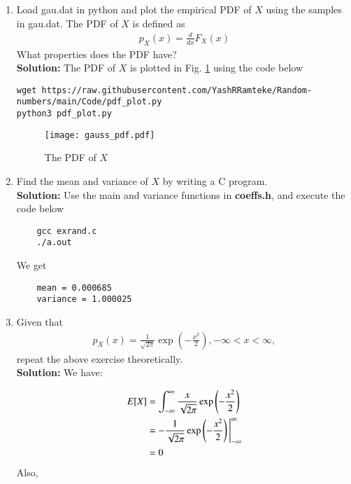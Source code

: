 \documentclass[journal,12pt,twocolumn]{IEEEtran}
\newcommand{\solution}{\noindent \textbf{Solution: }}
\providecommand{\brak}[1]{\ensuremath{\left(#1\right)}}
\numberwithin{equation}{section}
\renewcommand\thesection{\arabic{section}}
\begin{document}
\begin{enumerate}[label=\thesection.\arabic*
,ref=\thesection.\theenumi]
\item
Load gau.dat in python and plot the empirical PDF of $X$ using the samples in gau.dat. The PDF of $X$ is defined as
\begin{align}
p_{X}(x) = \frac{d}{dx}F_{X}(x)
\end{align}
What properties does the PDF have?
\\
\solution The PDF of $X$ is plotted in Fig. \ref{fig:gauss_pdf} using the code below
\begin{lstlisting}
wget https://raw.githubusercontent.com/YashRRamteke/Random-numbers/main/Code/pdf_plot.py
python3 pdf_plot.py
\end{lstlisting}
\begin{figure}
\centering
\texttt{[image: gauss\_pdf.pdf]}
\caption{The PDF of $X$}
\label{fig:gauss_pdf}
\end{figure}

\item Find the mean and variance of $X$ by writing a C program.
\\
\solution Use the main and variance functions in \textbf{coeffs.h}, and execute the code below
\begin{lstlisting}
    gcc exrand.c
    ./a.out
\end{lstlisting}
We get
\begin{lstlisting}
    mean = 0.000685
    variance = 1.000025
\end{lstlisting}


\item Given that 
\begin{align}
p_{X}(x) = \frac{1}{\sqrt{2\pi}}\exp\brak{-\frac{x^2}{2}}, -\infty < x < \infty,
\end{align}
repeat the above exercise theoretically.
\\
\solution  We have:
    
\begin{align}
    E[X] &=  \int_{-\infty}^{\infty} \frac{x}{\sqrt{2\pi}}\exp{\left(-\frac{x^2}{2}\right)} \\
    &= -\frac{1}{\sqrt{2\pi}}\exp\brak{-\frac{x^2}{2}} \Bigg{|}_{-\infty}^{\infty} \\
    &= 0 
\end{align}
Also,
    

\end{enumerate}
\end{document}
